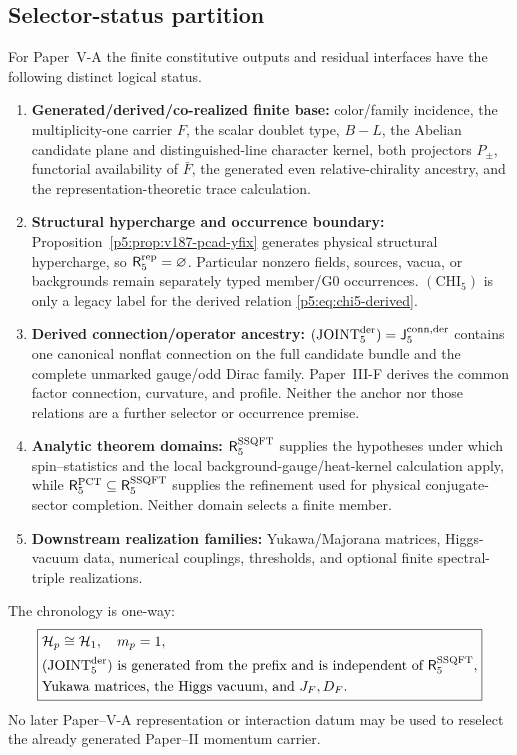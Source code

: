 \documentclass[12pt,a4paper]{article}
\begin{document}
\label{p5:part:conclusion-export-ledger}

\subsection{Selector-status partition}
\label{p5:sec:selector-status-partition}
For Paper~V-A the finite constitutive outputs and residual interfaces have the
following distinct logical status.
\begin{enumerate}[label=(\roman*),leftmargin=2.2em]
\item \textbf{Generated/derived/co-realized finite base:} color/family
      incidence, the multiplicity-one carrier \(F\), the scalar doublet type,
      \(B-L\), the Abelian candidate plane and distinguished-line character
      kernel, both projectors \(P_\pm\), functorial availability of \(\bar F\),
      the generated even relative-chirality ancestry, and the
      representation-theoretic trace calculation.
\item \textbf{Structural hypercharge and occurrence boundary:}
      Proposition~\ref{p5:prop:v187-pcad-yfix} generates physical structural
      hypercharge, so \(\mathsf R_5^{\rm rep}=\varnothing\).  Particular
      nonzero fields, sources, vacua, or backgrounds remain separately typed
      member/G0 occurrences.  \((\mathrm{CHI}_5)\) is only a legacy label for
      the derived relation \eqref{p5:eq:chi5-derived}.
\item \textbf{Derived connection/operator ancestry:}
      \(({\rm JOINT}_5^{\rm der})=\mathsf J_5^{\rm conn,der}\) contains one
      canonical nonflat connection on the full candidate bundle and the
      complete unmarked gauge/odd Dirac family.  Paper~III-F derives the
      common factor connection, curvature, and profile.  Neither the anchor
      nor those relations are a further selector or occurrence premise.
\item \textbf{Analytic theorem domains:}
      \(\mathsf R_5^{\rm SSQFT}\) supplies the hypotheses under which
      spin--statistics and the local background-gauge/heat-kernel calculation apply, while
      \(\mathsf R_5^{\rm PCT}\subseteq\mathsf R_5^{\rm SSQFT}\) supplies the
      refinement used for physical conjugate-sector completion.  Neither
      domain selects a finite member.
\item \textbf{Downstream realization families:} Yukawa/Majorana matrices,
      Higgs-vacuum data, numerical couplings, thresholds, and optional finite
      spectral-triple realizations.
\end{enumerate}
The chronology is one-way:
\[
\boxed{\begin{aligned}
&\mathcal H_p\cong\mathcal H_1,\quad m_p=1,\\
&({\rm JOINT}_5^{\rm der})\text{ is generated from the prefix and is
independent of }\mathsf R_5^{\rm SSQFT},\\
&\text{Yukawa matrices, the Higgs vacuum, and }J_F,D_F.
\end{aligned}}
\]
No later Paper--V-A representation or interaction datum may be used to reselect
the already generated Paper--II momentum carrier.
\end{document}
